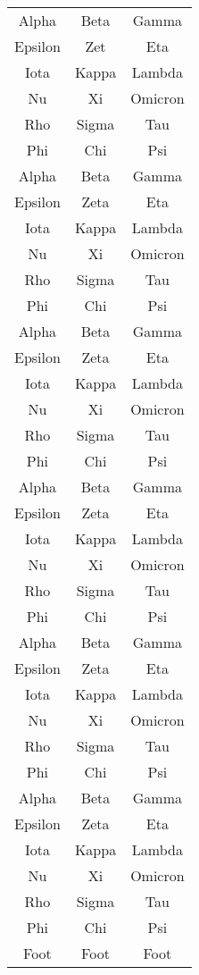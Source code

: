{\begin{longtable}[c]{ccc}
    Alpha & Beta & Gamma \\
    Epsilon & Zet & Eta \\
    Iota & Kappa & Lambda \\
    Nu & Xi & Omicron \\
    Rho & Sigma & Tau \\
    Phi & Chi & Psi \\
    Alpha & Beta & Gamma \\
    Epsilon & Zeta & Eta \\
    Iota & Kappa & Lambda \\
    Nu & Xi & Omicron \\
    Rho & Sigma & Tau \\
    Phi & Chi & Psi \\
    Alpha & Beta & Gamma \\
    Epsilon & Zeta & Eta \\
    Iota & Kappa & Lambda \\
    Nu & Xi & Omicron \\
    Rho & Sigma & Tau \\
    Phi & Chi & Psi \\
    Alpha & Beta & Gamma \\
    Epsilon & Zeta & Eta \\
    Iota & Kappa & Lambda \\
    Nu & Xi & Omicron \\
    Rho & Sigma & Tau \\
    Phi & Chi & Psi \\
    Alpha & Beta & Gamma \\
    Epsilon & Zeta & Eta \\
    Iota & Kappa & Lambda \\
    Nu & Xi & Omicron \\
    Rho & Sigma & Tau \\
    Phi & Chi & Psi \\
    Alpha & Beta & Gamma \\
    Epsilon & Zeta & Eta \\
    Iota & Kappa & Lambda \\
    Nu & Xi & Omicron \\
    Rho & Sigma & Tau \\
    Phi & Chi & Psi \\
    Foot & Foot & Foot \\
\end{longtable}
}
